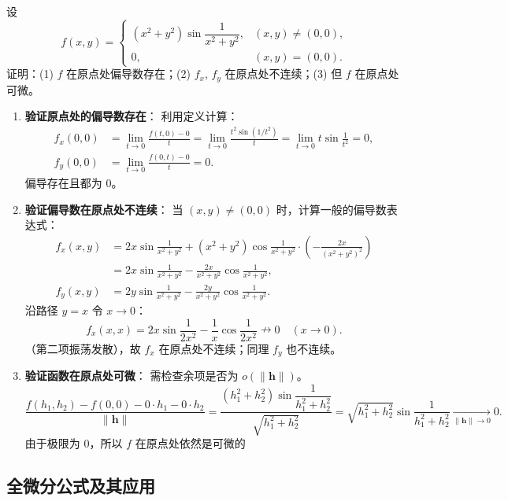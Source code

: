 \documentclass[lang=cn,11pt]{elegantbook}
\begin{document}
\begin{exercise}[可微但偏导数不连续] \label{ex:diff-but-pd-disc}
设
\[
f(x,y)=
\begin{cases}
(x^2+y^2)\sin\dfrac{1}{x^2+y^2},&(x,y) \neq (0,0),\\[8pt]
0,&(x,y)=(0,0).
\end{cases}
\]
证明：(1) $f$ 在原点处偏导数存在；(2) $f_x$, $f_y$ 在原点处不连续；(3) 但 $f$ 在原点处可微。
\end{exercise}

\begin{solution}
\begin{enumerate}
  \item \textbf{验证原点处的偏导数存在}：
  利用定义计算：
  \begin{align*}
  f_x(0,0)&=\lim_{t\to 0}\frac{f(t,0)-0}{t} =\lim_{t\to 0}\frac{t^2\sin(1/t^2)}{t} =\lim_{t\to 0}t\sin\frac{1}{t^2}=0,\\[6pt]
  f_y(0,0)&=\lim_{t\to 0}\frac{f(0,t)-0}{t}=0.
  \end{align*}
  偏导存在且都为 $0$。
  
  \item \textbf{验证偏导数在原点处不连续}：
  当 $(x,y) \neq (0,0)$ 时，计算一般的偏导数表达式：
  \begin{align*}
  f_x(x,y)&=2x\sin\frac{1}{x^2+y^2} +(x^2+y^2)\cos\frac{1}{x^2+y^2}\cdot\!\left(-\frac{2x}{(x^2+y^2)^2}\right)\\
  &=2x\sin\frac{1}{x^2+y^2}-\frac{2x}{x^2+y^2}\cos\frac{1}{x^2+y^2},\\[8pt]
  f_y(x,y)&=2y\sin\frac{1}{x^2+y^2}-\frac{2y}{x^2+y^2}\cos\frac{1}{x^2+y^2}.
  \end{align*}
  沿路径 $y=x$ 令 $x\to 0$：
  \[
  f_x(x,x)=2x\sin\frac{1}{2x^2}-\frac{1}{x}\cos\frac{1}{2x^2} \nrightarrow 0\quad(x\to 0).
  \]
  （第二项振荡发散），故 $f_x$ 在原点处不连续；同理 $f_y$ 也不连续。
  
  \item \textbf{验证函数在原点处可微}：
  需检查余项是否为 $o(\|\boldsymbol h\|)$。
  \[
  \frac{f(h_1,h_2)-f(0,0)-0\cdot h_1-0\cdot h_2}{\|\boldsymbol h\|} =\frac{(h_1^2+h_2^2)\sin\dfrac{1}{h_1^2+h_2^2}}{\sqrt{h_1^2+h_2^2}} =\sqrt{h_1^2+h_2^2}\sin\frac{1}{h_1^2+h_2^2} \xrightarrow[\|\boldsymbol h\|\to 0]{}0.
  \]
  由于极限为 $0$，所以 $f$ 在原点处依然是可微的
\end{enumerate}
\end{solution}


\subsection{全微分公式及其应用}
\end{document}
